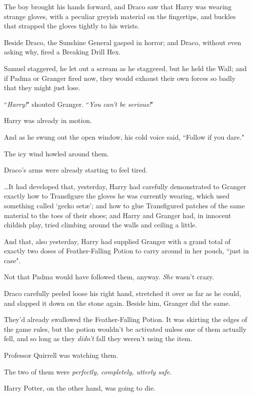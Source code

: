 The boy brought his hands forward, and Draco saw that Harry was wearing strange gloves, with a peculiar greyish material on the fingertips, and buckles that strapped the gloves tightly to his wrists.

Beside Draco, the Sunshine General gasped in horror; and Draco, without even asking why, fired a Breaking Drill Hex.

Samuel staggered, he let out a scream as he staggered, but he held the Wall; and if Padma or Granger fired now, they would exhaust their own forces so badly that they might just lose.

``\emph{Harry!}" shouted Granger. ``\emph{You can't be serious!}"

Harry was already in motion.

And as he swung out the open window, his cold voice said, ``Follow if you dare."

\later

The icy wind howled around them.

Draco's arms were already starting to feel tired.

{\ldots}It had developed that, yesterday, Harry had carefully demonstrated to Granger exactly how to Transfigure the gloves he was currently wearing, which used something called `gecko setæ'; and how to glue Transfigured patches of the same material to the toes of their shoes; and Harry and Granger had, in innocent childish play, tried climbing around the walls and ceiling a little.

And that, also yesterday, Harry had supplied Granger with a grand total of exactly two doses of Feather-Falling Potion to carry around in her pouch, ``just in case".

Not that Padma would have followed them, anyway. \emph{She} wasn't crazy.

Draco carefully peeled loose his right hand, stretched it over as far as he could, and slapped it down on the stone again. Beside him, Granger did the same.

They'd already swallowed the Feather-Falling Potion. It was skirting the edges of the game rules, but the potion wouldn't be activated unless one of them actually fell, and so long as they \emph{didn't} fall they weren't using the item.

Professor Quirrell was watching them.

The two of them were \emph{perfectly, completely, utterly safe}.

Harry Potter, on the other hand, was going to die.

